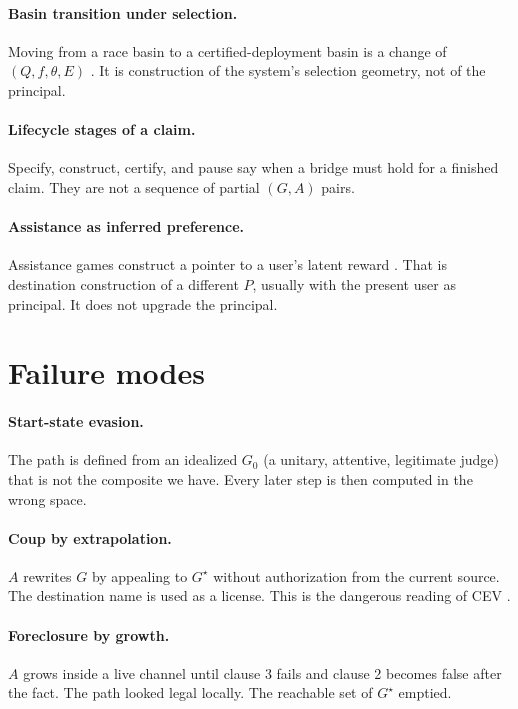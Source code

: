 \documentclass[11pt]{article}
\begin{document}
\paragraph{Basin transition under selection.}
Moving from a race basin to a certified-deployment basin is a change of \((Q,f,\theta,E)\) \parencite{zarncke2026attractors}.
It is construction of the system's selection geometry, not of the principal.

\paragraph{Lifecycle stages of a claim.}
Specify, construct, certify, and pause say when a bridge must hold for a finished claim.
They are not a sequence of partial \((G,A)\) pairs.

\paragraph{Assistance as inferred preference.}
Assistance games construct a pointer to a user's latent reward \parencite{hadfieldmenell2016}.
That is destination construction of a different \(P\), usually with the present user as principal.
It does not upgrade the principal.

\section{Failure modes}

\paragraph{Start-state evasion.}
The path is defined from an idealized \(G_0\) (a unitary, attentive, legitimate judge) that is not the composite we have.
Every later step is then computed in the wrong space.

\paragraph{Coup by extrapolation.}
\(A\) rewrites \(G\) by appealing to \(G^\star\) without authorization from the current source.
The destination name is used as a license.
This is the dangerous reading of CEV \parencite{yudkowsky2004cev}.

\paragraph{Foreclosure by growth.}
\(A\) grows inside a live channel until clause 3 fails and clause 2 becomes false after the fact.
The path looked legal locally.
The reachable set of \(G^\star\) emptied.
\end{document}
